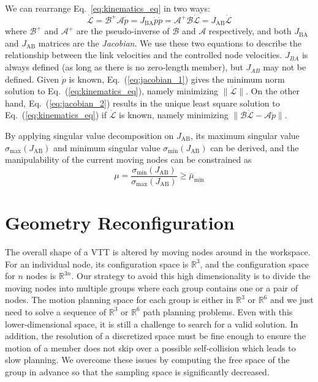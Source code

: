 \documentclass[journal]{IEEEtran}
\begin{document}
We can rearrange Eq.~\eqref{eq:kinematics_eq} in two ways:
\begin{subequations}
  \begin{equation}
    \label{eq:jacobian_1}
    \dot{\mathcal{L}} =
    \mathcal{B}^+\mathcal{A}\dot{p} = J_{\mathrm{BA}}\dot{p}
  \end{equation}
  \begin{equation}
    \label{eq:jacobian_2}
    \dot{p} =
    \mathcal{A}^+\mathcal{B}\dot{\mathcal{L}} =
    J_{\mathrm{AB}}\dot{\mathcal{L}}
  \end{equation}
\end{subequations}
where $\mathcal{B}^+$ and $\mathcal{A}^+$ are the pseudo-inverse of
$\mathcal{B}$ and $\mathcal{A}$ respectively, and both
$J_{\mathrm{BA}}$ and $J_{\mathrm{AB}}$ matrices are the
\textit{Jacobian}. We use these two equations to describe the
relationship between the link velocities and the controlled node
velocities. $J_{BA}$ is always defined (as long as there is no
zero-length member), but $J_{AB}$ may not be defined. Given $\dot{p}$
is known, Eq.~(\ref{eq:jacobian_1}) gives the minimum norm solution to
Eq.~(\ref{eq:kinematics_eq}), namely minimizing
$\|\dot{\mathcal{L}}\|$. On the other hand, Eq.~(\ref{eq:jacobian_2})
results in the unique least square solution to
Eq.~(\ref{eq:kinematics_eq}) if $\dot{\mathcal{L}}$ is known, namely
minimizing $\|\mathcal{B}\dot{\mathcal{L}}-\mathcal{A}\dot{p}\|$.

By applying singular value decomposition on $J_{\mathrm{AB}}$, its
maximum singular value $\sigma_{\max}(J_{\mathrm{AB}})$ and minimum
singular value $\sigma_{\min}(J_{\mathrm{AB}})$ can be derived, and
the manipulability of the current moving nodes can be constrained as
\begin{equation}
  \label{eq:manipulability-constraint}
  \mu = \frac{\sigma_{\min}(J_{\mathrm{AB}})}{\sigma_{\max}(J_{\mathrm{AB}})} \ge \bar{\mu}_{\min}
\end{equation}

\section{Geometry Reconfiguration}
\label{sec:geometry}

The overall shape of a VTT is altered by moving nodes around in the
workspace. For an individual node, its configuration space is
$\mathbb{R}^3$, and the configuration space for $n$ nodes is
$\mathbb{R}^{3n}$. Our strategy to avoid this high dimensionality is
to divide the moving nodes into multiple groups where each group
contains one or a pair of nodes. The motion planning space for each
group is either in $\mathbb{R}^3$ or $\mathbb{R}^6$ and we just need
to solve a sequence of $\mathbb{R}^3$ or $\mathbb{R}^6$ path planning
problems. Even with this lower-dimensional space, it is still a
challenge to search for a valid solution. In addition, the resolution
of a discretized space must be fine enough to ensure the motion of a
member does not skip over a possible self-collision which leads to
slow planning.  We overcome these issues by computing the free space
of the group in advance so that the sampling space is significantly
decreased.
\end{document}
